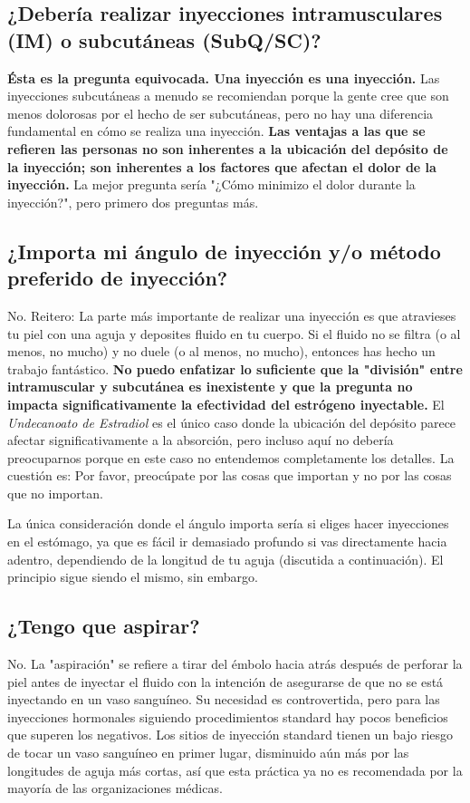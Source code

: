 \documentclass{article}
\begin{document}
\subsection{¿Debería realizar inyecciones intramusculares (IM) o subcutáneas (SubQ/SC)?}

\textbf{Ésta es la pregunta equivocada. Una inyección es una inyección.} Las inyecciones subcutáneas a menudo se recomiendan porque la gente cree que son menos dolorosas por el hecho de ser subcutáneas, pero no hay una diferencia fundamental en cómo se realiza una inyección. \textbf{Las ventajas a las que se refieren las personas no son inherentes a la ubicación del depósito de la inyección; son inherentes a los factores que afectan el dolor de la inyección.} La mejor pregunta sería "¿Cómo minimizo el dolor durante la inyección?", pero primero dos preguntas más.

\subsection{¿Importa mi ángulo de inyección y/o método preferido de inyección?}\label{5-9}

No. Reitero: La parte más importante de realizar una inyección es que atravieses tu piel con una aguja y deposites fluido en tu cuerpo. Si el fluido no se filtra (o al menos, no mucho) y no duele (o al menos, no mucho), entonces has hecho un trabajo fantástico. \textbf{No puedo enfatizar lo suficiente que la "división" entre intramuscular y subcutánea es inexistente y que la pregunta no impacta significativamente la efectividad del estrógeno inyectable.} El \textit{Undecanoato de Estradiol} es el único caso donde la ubicación del depósito parece afectar significativamente a la absorción, pero incluso aquí no debería preocuparnos porque en este caso no entendemos completamente los detalles. La cuestión es: Por favor, preocúpate por las cosas que importan y no por las cosas que no importan.

La única consideración donde el ángulo importa sería si eliges hacer inyecciones en el estómago, ya que es fácil ir demasiado profundo si vas directamente hacia adentro, dependiendo de la longitud de tu aguja (discutida a continuación). El principio sigue siendo el mismo, sin embargo.

\subsection{¿Tengo que aspirar?}

No. La "aspiración" se refiere a tirar del émbolo hacia atrás después de perforar la piel antes de inyectar el fluido con la intención de asegurarse de que no se está inyectando en un vaso sanguíneo. Su necesidad es controvertida, pero para las inyecciones hormonales siguiendo procedimientos standard hay pocos beneficios que superen los negativos. Los sitios de inyección standard tienen un bajo riesgo de tocar un vaso sanguíneo en primer lugar, disminuido aún más por las longitudes de aguja más cortas, así que esta práctica ya no es recomendada por la mayoría de las organizaciones médicas.
\end{document}
